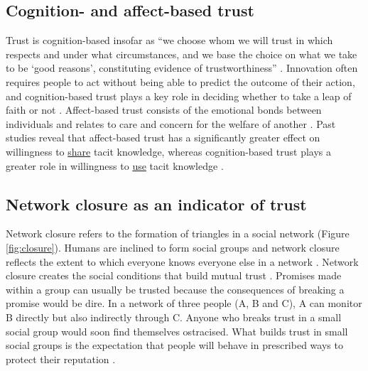 \subsection{Cognition- and affect-based trust}

Trust is cognition-based insofar as \enquote{we choose whom we will trust in which respects and under what circumstances, and we base the choice on what we take to be \enquote{good reasons}, constituting evidence of trustworthiness} \citep[][pg.~970]{lewis1985trust}. Innovation often requires people to act without being able to predict the outcome of their action, and cognition\hyp{}based trust plays a key role in deciding whether to take a leap of faith or not \citep{mcevily2011measuring}. Affect-based trust consists of the emotional bonds between individuals and relates to care and concern for the welfare of another \citep{mcallister1995affect}. Past studies reveal that affect-based trust has a significantly greater effect on willingness to \underline{share} tacit knowledge, whereas cognition-based trust plays a greater role in willingness to \underline{use} tacit knowledge \citep{levin2004strength,holste2010trust,ding2015research}. 

\subsection{Network closure as an indicator of trust}

Network closure refers to the formation of triangles in a social network (Figure \ref{fig:closure}). Humans are inclined to form social groups and network closure reflects the extent to which everyone knows everyone else in a network \citep{coleman1990foundations}. Network closure creates the social conditions that build mutual trust \citep{ahuja2000collaboration, fulmer2013trust}. Promises made within a group can usually be trusted because the consequences of breaking a promise would be dire. In a network of three people (A, B and C), A can monitor B directly but also indirectly through C. Anyone who breaks trust in a small social group would soon find themselves ostracised. What builds trust in small social groups is the expectation that people will behave in prescribed ways to protect their reputation \citep{coleman1990foundations, burt2005brokerage}.

